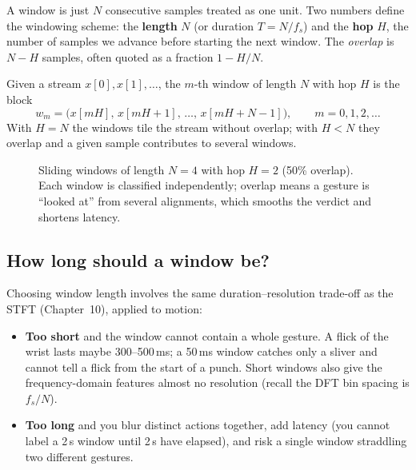 A window is just $N$ consecutive samples treated as one unit. Two numbers define
the windowing scheme: the \textbf{length} $N$ (or duration $T = N/f_s$) and the
\textbf{hop} $H$, the number of samples we advance before starting the next
window. The \emph{overlap} is $N - H$ samples, often quoted as a fraction
$1 - H/N$.

\begin{definition}
\label{ch38:def-window}
Given a stream $x[0], x[1], \dots$, the $m$-th window of length $N$ with hop $H$
is the block
\[
  w_m = \big( x[mH],\, x[mH+1],\, \dots,\, x[mH + N - 1] \big), \qquad m = 0,1,2,\dots
\]
With $H = N$ the windows tile the stream without overlap; with $H < N$ they
overlap and a given sample contributes to several windows.
\end{definition}

\begin{figure}[H]
\centering
{}
\caption{Sliding windows of length $N=4$ with hop $H=2$ (50\% overlap). Each
window is classified independently; overlap means a gesture is ``looked at'' from
several alignments, which smooths the verdict and shortens latency.}
\label{ch38:fig-sliding}
\end{figure}

\subsection{How long should a window be?}

Choosing window length involves the same duration--resolution trade-off as the STFT (Chapter~10), applied to motion:

\begin{itemize}
  \item \textbf{Too short} and the window cannot contain a whole gesture. A flick
        of the wrist lasts maybe 300--500\,ms; a 50\,ms window catches only a
        sliver and cannot tell a flick from the start of a punch. Short windows
        also give the frequency-domain features almost no resolution (recall the
        DFT bin spacing is $f_s/N$).
  \item \textbf{Too long} and you blur distinct actions together, add latency
        (you cannot label a 2\,s window until 2\,s have elapsed), and risk a single
        window straddling two different gestures.
\end{itemize}

